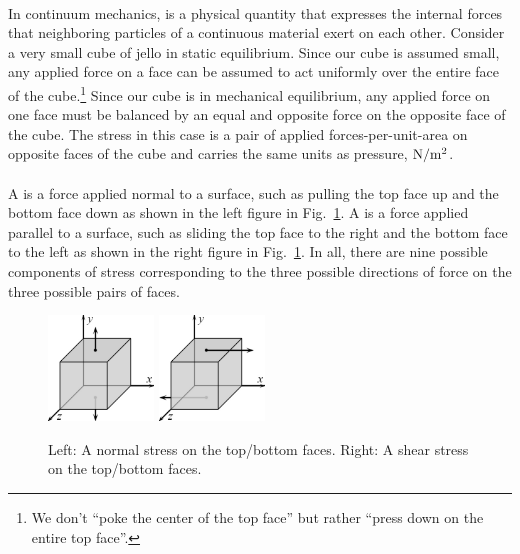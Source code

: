 \documentclass{article}
\begin{document}
\paragraph{}
In continuum mechanics,  is a physical quantity that expresses the internal 
forces that neighboring particles of a continuous material exert on each other.
Consider a very small cube of jello in static equilibrium.  Since our cube is assumed small, any applied force on a face can be assumed to act uniformly
over the entire face of the cube.\footnote{We don't ``poke the center of the top face'' but rather ``press down on the entire top face''.}  Since
our cube is in mechanical equilibrium, any applied force on one face must be balanced by an equal and opposite force on the opposite face of the cube.  
The {stress} in this case is a pair of applied forces-per-unit-area on opposite faces of the cube and carries the same units as
pressure, $\textrm{N}/\textrm{m}^{2}$.

\paragraph{}
A  is a force applied normal to a surface, such as pulling the top face up and the bottom face down as shown 
in the left figure in Fig.~\ref{stresses}.  A  is a force applied parallel to a surface, such as sliding the top face to the right and the bottom face to the left
as shown in the right figure in Fig.~\ref{stresses}.  In all, there are nine possible components of stress corresponding to the three possible directions of force on the three
possible pairs of faces.
	\begin{figure}[ht]	
	\centering
		\includegraphics[width = 0.25\textwidth]{89-PS7-P3-NormalStress}	\qquad\qquad \includegraphics[width = 0.25\textwidth]{	89-PS7-P3-ShearStress}
	\caption{Left: A normal stress on the top/bottom faces.  Right:  A shear stress on the top/bottom faces.}
	\label{stresses}
	\end{figure}
\end{document}
